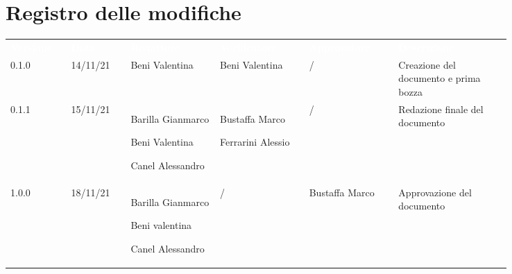 \section*{Registro delle modifiche}

{\renewcommand{\arraystretch}{1.5}
\scriptsize
\begin{tabular}{p{0.10\linewidth}p{0.10\linewidth}p{0.15\linewidth}p{0.15\linewidth}p{0.15\linewidth}p{0.19\linewidth}}
	\rowcolor[RGB]{33, 73, 50}
	\textcolor{white}{\textbf{Versione}} & \textcolor{white}{\textbf{Data}} & \textcolor{white}
	{\textbf{Redattore}} & \textcolor{white}{\textbf{Verificatore}} & \textcolor{white}{\textbf{Approvatore}} & \textcolor{white}
	{\textbf{Descrizione}}\\
	\rowcolor[RGB]{216, 235, 171}
	0.1.0 & 14/11/21 & Beni Valentina & Beni Valentina & / & Creazione del documento e prima bozza\\
	\rowcolor[RGB]{233, 245, 206}
	0.1.1 & 15/11/21 & Barilla Gianmarco \par  Beni Valentina  \par Canel Alessandro & Bustaffa Marco \par Ferrarini Alessio & / & Redazione finale del documento\\
	\rowcolor[RGB]{216, 235, 171}
	1.0.0 & 18/11/21 & Barilla Gianmarco \par  Beni valentina \par Canel Alessandro & / & Bustaffa Marco & Approvazione del documento
\end{tabular}	
}